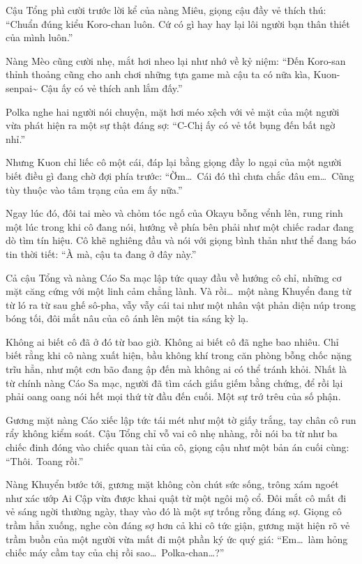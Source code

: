 \documentclass[../main.tex]{subfiles}
\begin{document}

Cậu Tổng phì cười trước lời kể của nàng Miêu, giọng cậu đầy vẻ thích thú: ``Chuẩn đúng kiểu Koro-chan luôn. Cứ có gì hay hay lại lôi người bạn thân thiết của mình luôn.''

Nàng Mèo cũng cười nhẹ, mắt hơi nheo lại như nhớ về kỷ niệm: ``Đến Koro-san thỉnh thoảng cũng cho anh chơi những tựa game mà cậu ta có nữa kìa, Kuon-senpai\~{} Cậu ấy có vẻ thích anh lắm đấy.''

Polka nghe hai người nói chuyện, mặt hơi méo xệch với vẻ mặt của một người vừa phát hiện ra một sự thật đáng sợ: ``C-Chị ấy có vẻ tốt bụng đến bất ngờ nhỉ.''

Nhưng Kuon chỉ liếc cô một cái, đáp lại bằng giọng đầy lo ngại của một người biết điều gì đang chờ đợi phía trước: ``Ờm\dots\ Cái đó thì chưa chắc đâu em\dots\ Cũng tùy thuộc vào tâm trạng của em ấy nữa.''

Ngay lúc đó, đôi tai mèo và chỏm tóc ngố của Okayu bỗng vểnh lên, rung rinh một lúc trong khi cô đang nói, hướng về phía bên phải như một chiếc radar đang dò tìm tín hiệu. Cô khẽ nghiêng đầu và nói với giọng bình thản như thể đang báo tin thời tiết: ``À mà, cậu ta đang ở đây này.''

Cả cậu Tổng và nàng Cáo Sa mạc lập tức quay đầu về hướng cô chỉ, những cơ mặt căng cứng với một linh cảm chẳng lành. Và rồi\dots\ một nàng Khuyển đang từ từ ló ra từ sau ghế sô-pha, vẫy vẫy cái tai như một nhân vật phản diện núp trong bóng tối, đôi mắt nâu của cô ánh lên một tia sáng kỳ lạ.


Không ai biết cô đã ở đó từ bao giờ. Không ai biết cô đã nghe bao nhiêu. Chỉ biết rằng khi cô nàng xuất hiện, bầu không khí trong căn phòng bỗng chốc nặng trĩu hẳn, như một cơn bão đang ập đến mà không ai có thể tránh khỏi. Nhất là từ chính nàng Cáo Sa mạc, người đã tìm cách giấu giếm bằng chứng, để rồi lại phải oang oang nói hết mọi thứ từ đầu đến cuối. Một sự trớ trêu của số phận.

Gương mặt nàng Cáo xiếc lập tức tái mét như một tờ giấy trắng, tay chân cô run rẩy không kiểm soát. Cậu Tổng chỉ vỗ vai cô nhẹ nhàng, rồi nói ba từ như ba chiếc đinh đóng vào chiếc quan tài của cô, giọng cậu như một bản án cuối cùng: ``Thôi. Toang rồi.''

Nàng Khuyển bước tới, gương mặt không còn chút sức sống, trông xám ngoét như xác ướp Ai Cập vừa được khai quật từ một ngôi mộ cổ. Đôi mắt cô mất đi vẻ sáng ngời thường ngày, thay vào đó là một sự trống rỗng đáng sợ. Giọng cô trầm hẳn xuống, nghe còn đáng sợ hơn cả khi cô tức giận, gương mặt hiện rõ vẻ trầm buồn của một người vừa mất đi một phần ký ức quý giá: ``Em\dots\ làm hỏng chiếc máy cầm tay của chị rồi sao\dots\ Polka-chan\dots?''
\end{document}
